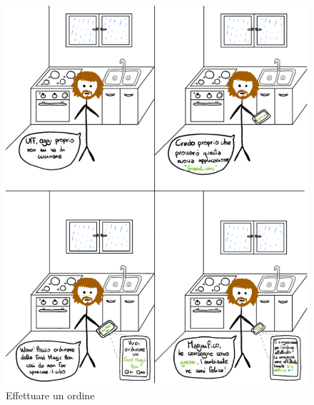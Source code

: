\documentclass{article}
\begin{document}
\begin{figure}[htpb]

\begin{minipage}{0.40\textwidth}
    \includegraphics[width=\textwidth]{Data/StoryBoard/Effetuare_ordine.png}
    \caption[Prima figura]{Effettuare un ordine} \label{fig:1}
\end{minipage}
\hspace{2cm}
\begin{minipage}{0.40\textwidth}

\end{minipage}
\end{figure}
\end{document}
